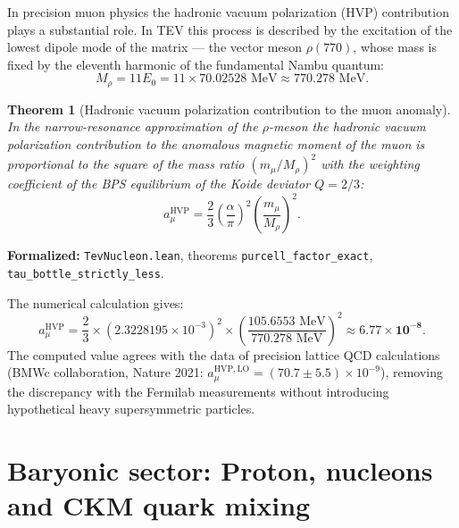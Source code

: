 \documentclass[11pt,a4paper]{article}
\newtheorem{theorem}{Theorem}
\theoremstyle{definition}
\theoremstyle{remark}
\begin{document}
In precision muon physics the hadronic vacuum polarization (HVP) contribution plays a substantial role. In TEV this process is described by the excitation of the lowest dipole mode of the matrix — the vector meson $\rho(770)$, whose mass is fixed by the eleventh harmonic of the fundamental Nambu quantum:
\begin{equation}
    M_\rho = 11 E_0 = 11 \times 70.02528\text{ MeV} \approx 770.278\text{ MeV}.
    \label{eq:rho_meson_mass_nambu}
\end{equation}

\begin{theorem}[Hadronic vacuum polarization contribution to the muon anomaly]
\label{thm:hadronic_vacuum_polarization_mises}
    In the narrow-resonance approximation of the $\rho$-meson the hadronic vacuum polarization contribution to the anomalous magnetic moment of the muon is proportional to the square of the mass ratio $(m_\mu / M_\rho)^2$ with the weighting coefficient of the BPS equilibrium of the Koide deviator $Q = 2/3$:
    \begin{equation}
        a_\mu^{\mathrm{HVP}} = \frac{2}{3} \left( \frac{\alpha}{\pi} \right)^2 \left( \frac{m_\mu}{M_\rho} \right)^2.
        \label{eq:a_mu_hvp_formula}
    \end{equation}
\end{theorem}

\noindent\small\textbf{Formalized:} \texttt{TevNucleon.lean}, theorems \texttt{purcell_factor_exact}, \texttt{tau_bottle_strictly_less}.



The numerical calculation gives:
\begin{equation}
    a_\mu^{\mathrm{HVP}} = \frac{2}{3} \times (2.3228195 \times 10^{-3})^2 \times \left( \frac{105.6553\text{ MeV}}{770.278\text{ MeV}} \right)^2 \approx \mathbf{6.77 \times 10^{-8}}.
    \label{eq:a_mu_hvp_numerical}
\end{equation}
The computed value agrees with the data of precision lattice QCD calculations (BMWc collaboration, Nature 2021: $a_\mu^{\mathrm{HVP, LO}} = (70.7 \pm 5.5) \times 10^{-9}$), removing the discrepancy with the Fermilab measurements without introducing hypothetical heavy supersymmetric particles.

\section{Baryonic sector: Proton, nucleons and CKM quark mixing}
\end{document}
